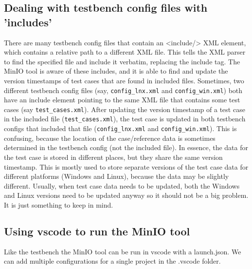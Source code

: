 \documentclass{deltares_memo}
\begin{document}
\subsection{Dealing with testbench config files with 'includes'}
There are many testbench config files that contain an <include/> XML element, which contains a relative path to a different XML file. This tells the XML parser to find the specified file and include it verbatim, replacing the include tag. The MinIO tool is aware of these includes, and it is able to find and update the version timestamps of test cases that are found in included files. Sometimes, two different testbench config files (say, \texttt{config\_lnx.xml} and \texttt{config\_win.xml}) both have an include element pointing to the same XML file that contains some test cases (say \texttt{test\_cases.xml}). After updating the version timestamp of a test case in the included file (\texttt{test\_cases.xml}), the test case is updated in both testbench configs that included that file (\texttt{config\_lnx.xml} and \texttt{config\_win.xml}). This is confusing, because the location of the case/reference data is sometimes determined in the testbench config (not the included file). In essence, the data for the test case is stored in different places, but they share the same version timestamp. This is mostly used to store separate versions of the test case data for different platforms (Windows and Linux), because the data may be slightly different. Usually, when test case data needs to be updated, both the Windows and Linux versions need to be updated anyway so it should not be a big problem. It is just something to keep in mind.

\newpage
\subsection{Using vscode to run the MinIO tool}
Like the testbench the MinIO tool can be run in vscode with a launch.json. We can add multiple configurations for a single project in the .vscode folder.
\end{document}
